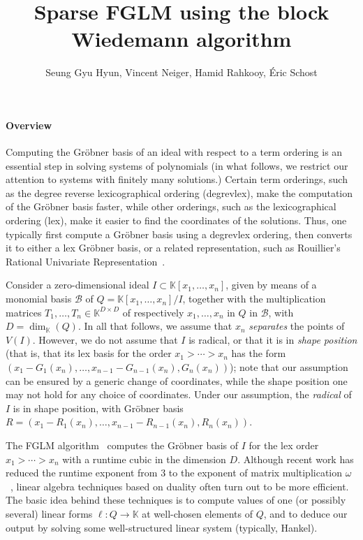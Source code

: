 \documentclass[12pt]{article}
\title{Sparse FGLM using the block Wiedemann algorithm}
\author{Seung Gyu Hyun, Vincent Neiger, Hamid Rahkooy, \' Eric Schost}
\begin{document}
\maketitle

\paragraph{Overview}
Computing the Gr\"obner basis of an ideal with respect to a term
ordering is an essential step in solving systems of polynomials (in
what follows, we restrict our attention to systems with finitely many
solutions.)  Certain term orderings, such as the degree reverse
lexicographical ordering (degrevlex), make the computation of the
Gr\"obner basis faster, while other orderings, such as the
lexicographical ordering (lex), make it easier to find the coordinates
of the solutions. Thus, one typically first compute a Gr\"obner basis
using a degrevlex ordering, then converts it to either a lex Gr\"obner
basis, or a related representation, such as Rouillier's Rational
Univariate Representation~\cite{Rouillier99}.

Consider a zero-dimensional ideal $I \subset \mathbb{K}[x_1, \dots,
  x_n]$, given by means of a monomial basis $\mathscr{B}$ of
$Q=\mathbb{K}[x_1, \dots, x_n]/I$, together with the multiplication
matrices $T_1,\dots, T_n \in \mathbb{K}^{D \times D}$ of respectively
$x_1,\dots,x_n$ in $Q$ in $\mathscr{B}$, with
$D=\dim_\mathbb{K}(Q)$. In all that follows, we assume that $x_n$ {\em
  separates} the points of $V(I)$. However, we do not assume that $I$
is radical, or that it is in {\em shape position} (that is, that its
lex basis for the order $x_1 > \cdots > x_n$ has the form
$(x_1-G_1(x_n),\dots,x_{n-1}-G_{n-1}(x_n),G_n(x_n))$); note that our
assumption can be ensured by a generic change of coordinates, while
the shape position one may not hold for any choice of
coordinates. Under our assumption, the {\em radical} of $I$ is in
shape position, with Gr\"obner basis
$R=(x_1-R_1(x_n),\dots,x_{n-1}-R_{n-1}(x_n),R_n(x_n))$.

The FGLM algorithm~\cite{FaGiLaMo93} computes the Gr\"obner basis of
$I$ for the lex order $x_1 > \cdots > x_n$ with a runtime cubic in the dimension
$D$. Although recent work has reduced the runtime exponent from $3$ to
the exponent of matrix multiplication
$\omega$~\cite{FaGaHuRe13,Neiger16}, linear algebra techniques based
on duality often turn out to be more efficient. The basic idea behind
these techniques is to compute values of one (or possibly several)
linear forms $\ell: Q \to \mathbb{K}$ at well-chosen elements of $Q$,
and to deduce our output by solving some well-structured linear system
(typically, Hankel).
\end{document}
